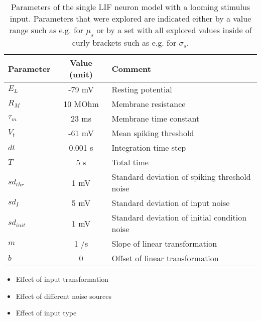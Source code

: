 \documentclass[a4paper,10pt,hidelinks]{scrreprt}
\begin{document}
	\begin{table} [!th]
		\begin{center}
			\begin{tabular}{|l|c|p{7cm}|}
				\hline
				\textbf{Parameter} & \textbf{Value (unit)} & \textbf{Comment} \\
				\hline
				$E_L$ & -79 mV & Resting potential\\
				$R_M$ & 10 MOhm & Membrane resistance\\
				$\tau_{m}$ & 23 ms & Membrane time constant\\
				$V_t$ & -61 mV & Mean spiking threshold\\
				$dt$ & 0.001 s & Integration time step\\
				$T$ & 5 s & Total time\\
				$sd_{thr}$ & 1 mV & Standard deviation of spiking threshold noise\\
				$sd_{I}$ & 5 mV & Standard deviation of input noise\\
				$sd_{init}$ & 1 mV & Standard deviation of initial condition noise\\
				$m$ & 1 \textdegree/s  & Slope of linear transformation\\
				$b$ & 0 \textdegree & Offset of linear transformation\\
				\hline
			\end{tabular}
		\end{center}
		\caption{Parameters of the single LIF neuron model with a looming stimulus input. Parameters that were explored are indicated either by a value range such as e.g. for $\mu_s$ or by a set with all explored values inside of curly brackets such as e.g. for $\sigma_s$.}
		\label{tab:neuroparams}
	\end{table}
	\begin{itemize}
		\item Effect of input transformation
		\item Effect of different noise sources
		\item Effect of input type
	\end{itemize}
\end{document}
